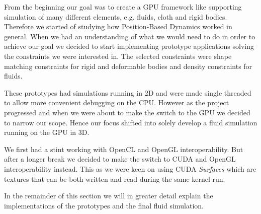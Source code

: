 From the beginning our goal was to create a GPU framework like
\cite{macklin2014unified} supporting simulation of many different elements,
e.g. fluids, cloth and rigid bodies. Therefore we started of studying how
Position-Based Dynamics worked in general. When we had an understanding of what
we would need to do in order to achieve our goal we decided to start
implementing prototype applications solving the constraints we were interested
in. The selected constraints were shape matching constraints for rigid and
deformable bodies and density constraints for fluids.

These prototypes had simulations running in 2D and were made single threaded to
allow more convenient debugging on the CPU. However as the project progressed
and when we were about to make the switch to the GPU we decided to narrow our
scope. Hence our focus shifted into solely develop a fluid simulation running
on the GPU in 3D.

We first had a stint working with OpenCL and OpenGL interoperability. But after
a longer break we decided to make the switch to CUDA and OpenGL
interoperability instead. This as we were keen on using CUDA \textit{Surfaces}
which are textures that can be both written and read during the same kernel
run.

In the remainder of this section we will in greater detail explain the
implementations of the prototypes and the final fluid simulation.

